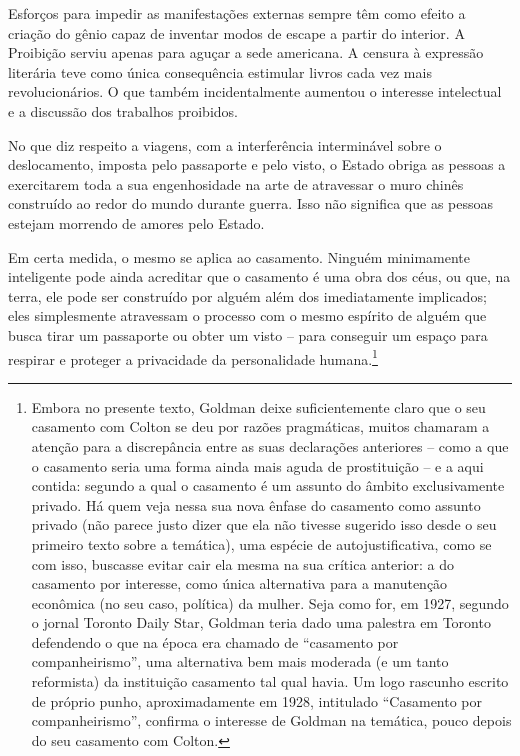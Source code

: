 Esforços para impedir as manifestações externas sempre têm como efeito a
criação do gênio capaz de inventar modos de escape a partir do interior.
A Proibição serviu apenas para aguçar a sede americana. A censura à
expressão literária teve como única consequência estimular livros cada
vez mais revolucionários. O que também incidentalmente aumentou o
interesse intelectual e a discussão dos trabalhos proibidos.

No que diz respeito a viagens, com a interferência interminável sobre o
deslocamento, imposta pelo passaporte e pelo visto, o Estado obriga as
pessoas a exercitarem toda a sua engenhosidade na arte de atravessar o
muro chinês construído ao redor do mundo durante guerra. Isso não
significa que as pessoas estejam morrendo de amores pelo Estado.

Em certa medida, o mesmo se aplica ao casamento. Ninguém minimamente
inteligente pode ainda acreditar que o casamento é uma obra dos céus, ou
que, na terra, ele pode ser construído por alguém além dos imediatamente
implicados; eles simplesmente atravessam o processo com o mesmo espírito
de alguém que busca tirar um passaporte ou obter um visto -- para
conseguir um espaço para respirar e proteger a privacidade da
personalidade humana.\footnote{Embora no presente texto, Goldman deixe
  suficientemente claro que o seu casamento com Colton se deu por razões
  pragmáticas, muitos chamaram a atenção para a discrepância entre as
  suas declarações anteriores -- como a que o casamento seria uma forma
  ainda mais aguda de prostituição -- e a aqui contida: segundo a qual o
  casamento é um assunto do âmbito exclusivamente privado. Há quem veja
  nessa sua nova ênfase do casamento como assunto privado (não parece
  justo dizer que ela não tivesse sugerido isso desde o seu primeiro
  texto sobre a temática), uma espécie de autojustificativa, como se com
  isso, buscasse evitar cair ela mesma na sua crítica anterior: a do
  casamento por interesse, como única alternativa para a manutenção
  econômica (no seu caso, política) da mulher. Seja como for, em 1927,
  segundo o jornal Toronto Daily Star, Goldman teria dado uma palestra
  em Toronto defendendo o que na época era chamado de ``casamento por
  companheirismo'', uma alternativa bem mais moderada (e um tanto
  reformista) da instituição casamento tal qual havia. Um logo rascunho
  escrito de próprio punho, aproximadamente em 1928, intitulado
  ``Casamento por companheirismo'', confirma o interesse de Goldman na
  temática, pouco depois do seu casamento com Colton.}

